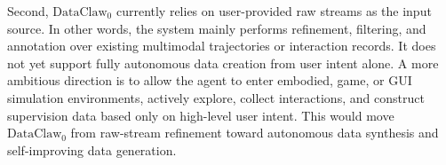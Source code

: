 Second, $\text{DataClaw}_0$ currently relies on user-provided raw streams as the input source. In other words, the system mainly performs refinement, filtering, and annotation over existing multimodal trajectories or interaction records. It does not yet support fully autonomous data creation from user intent alone. A more ambitious direction is to allow the agent to enter embodied, game, or GUI simulation environments, actively explore, collect interactions, and construct supervision data based only on high-level user intent. This would move $\text{DataClaw}_0$ from raw-stream refinement toward autonomous data synthesis and self-improving data generation.



